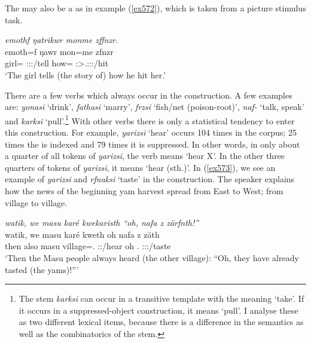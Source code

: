The  may also be a  as in example (\ref{ex572}), which is taken from a picture stimulus task.

\begin{exe}
	\ex \emph{emothf ŋatrikwr monme zffnzr.}\\
	\gll emoth=f ŋawr mon=me zfnzr\\
	girl=\Erg{} \Stsg:\Sbj:\Nonpast:\Ipfv/tell how=\Ins{} \Stsg:\Sbj>\Tsg.\F:\Obj:\Rpst:\Ipfv/hit\\
	\trans `The girl tells (the story of) how he hit her.'
	\label{ex572}
\end{exe}

There are a few verbs which always occur in the  construction. A few examples are: \emph{yonasi} `drink', \emph{fathasi} `marry', \emph{frzsi} `fish/net (poison-root)', \emph{naf-} `talk, speak' and \emph{karksi} `pull'.\footnote{The stem \emph{karksi} can occur in a transitive template with the meaning `take'. If it occurs in a suppressed-object construction, it means `pull'. I analyse these as two different lexical items, because there is a difference in the semantics as well as the combinatorics of the stem.} With other verbs there is only a statistical tendency to enter this construction. For example, \emph{yarizsi} `hear' occurs 104 times in the corpus; 25 times the  is indexed and 79 times it is suppressed. In other words, in only about a quarter of all tokens of \emph{yarizsi}, the verb means `hear X'. In the other three quarters of tokens of \emph{yarizsi}, it means `hear (sth.)'. In (\ref{ex573}), we see an example of \emph{yarizsi} and \emph{rfnaksi} `taste' in the  construction. The speaker explains how the news of the beginning yam harvest spread from East to West; from village to village.

\begin{exe}
	\ex \emph{watik, we masu karé kwekaristh ``oh, nafa z zärfnth!''}\\
	\gll watik, we masu karé kweth oh nafa z zäth\\
	then also masu village=\Erg.\Nsg{} \Stpl:\Sbj:\Iter/hear oh \Stnsg.\Erg{} \Iam{} \Stpl:\Sbj:\Rpst:\Pfv/taste\\
	\trans `Then the Masu people always heard (the other village): ``Oh, they have already tasted (the yams)!'''
	\label{ex573}
\end{exe}

